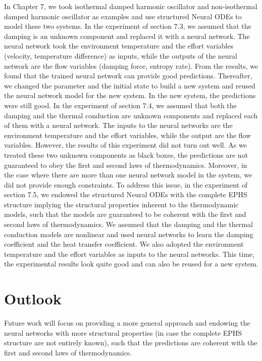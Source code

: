 \documentclass[
	parskip, 			   %
	twoside, 			   %
	DIV=14, 			   %
	BCOR=15.0mm, 		   %
	headsepline, 		   %
	open=right, 		   %
	captions=tableheading, %
	bibliography=totoc,    %
	numbers=noenddot       %
]{scrreprt}
\begin{document}
In Chapter 7, we took isothermal damped harmonic oscillator and non-isothermal damped harmonic oscillator as examples and use structured Neural ODEs to model these two systems. In the experiment of section 7.3, we assumed that the damping is an unknown component and replaced it with a neural network. The neural network took the environment temperature and the effort variables (velocity, temperature difference) as inputs, while the outputs of the neural network are the flow variables (damping force, entropy rate). From the results, we found that the trained neural network can provide good predictions. Thereafter, we changed the parameter and the initial state to build a new system and reused the neural network model for the new system. In the new system, the predictions were still good. In the experiment of section 7.4, we assumed that both the damping and the thermal conduction are unknown components and replaced each of them with a neural network. The inputs to the neural networks are the environment temperature and the effort variables, while the output are the flow variables. However, the results of this experiment did not turn out well. As we treated these two unknown components as black boxes, the predictions are not guaranteed to obey the first and second laws of thermodynamics. Moreover, in the case where there are more than one neural network model in the system, we did not provide enough constraints. To address this issue, in the experiment of section 7.5, we endowed the structured Neural ODEs with the complete EPHS structure implying the structural properties inherent to the thermodynamic models, such that the models are guaranteed to be coherent with the first and second laws of thermodynamics. We assumed that the damping and the thermal conduction models are nonlinear and used neural networks to learn the damping coefficient and the heat transfer coefficient. We also adopted the environment temperature and the effort variables as inputs to the neural networks. This time, the experimental results look quite good and can also be reused for a new system.

\section{Outlook}
Future work will focus on providing a more general approach and endowing the neural networks with more structural properties (in case the complete EPHS structure are not entirely known), such that the predictions are coherent with the first and second laws of thermodynamics. 
\end{document}
